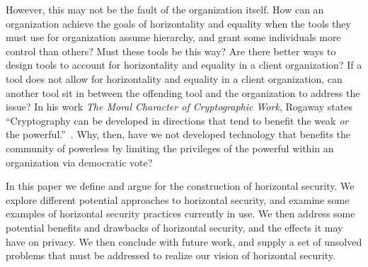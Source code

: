 However, this may not be the fault of the organization itself. How can an 
organization achieve the goals of horizontality and equality when the tools they
must use for organization assume hierarchy, and grant some individuals more
control than others? Must these tools be this way? Are there better ways to
design tools to account for horizontality and equality in a client organization?
If a tool does not allow for horizontality and equality in a client
organization, can another tool sit in between the offending tool and the
organization to address the issue? In his work \textit{The Moral Character of
Cryptographic Work}, Rogaway states ``Cryptography can be developed in
directions that tend to benefit the weak \textit{or} the 
powerful.''~\cite{rogaway2015moral}. Why, then, have we not developed technology
that benefits the community of powerless by limiting the privileges of the
powerful within an organization via democratic vote?

In this paper we define and argue for the construction of horizontal security.
We explore different potential approaches to horizontal security, and examine
some examples of horizontal security practices currently in use. We then address
some potential benefits and drawbacks of horizontal security, and the effects it
may have on privacy. We then conclude with future work, and supply a set of
unsolved problems that must be addressed to realize our vision of horizontal
security.
